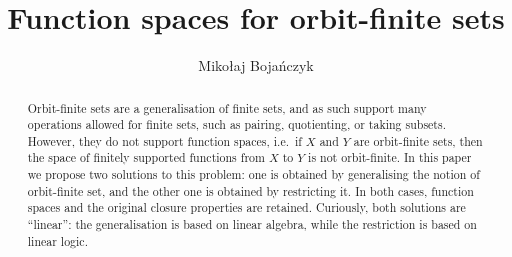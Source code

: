 \documentclass[a4paper,UKenglish,cleveref, autoref, numberwithinsect, thm-restate,anonymous]{lipics-v2021}
\title{Function spaces for orbit-finite sets} %
\author{Miko{\l}aj Boja\'nczyk}{University of Warsaw}{bojan@mimuw.edu.pl}{https://orcid.org/0000-0002-1825-0097}{(Optional) author-specific funding acknowledgements}
\begin{document}
\newcommand{\loli}{\multimap}


\maketitle 
\begin{abstract}
    Orbit-finite sets are a generalisation of finite sets, and as such support many operations allowed for finite sets, such as pairing, quotienting, or taking subsets. However, they do not support function spaces, i.e.~if $X$ and $Y$ are orbit-finite sets, then the space of finitely supported functions from $X$ to $Y$ is not orbit-finite. In this paper we propose two solutions to this problem: one is obtained by generalising the notion of orbit-finite set, and the other one is obtained by restricting it. In both cases, function spaces and the original closure properties are retained. Curiously, both solutions are ``linear'': the generalisation is based on linear algebra, while the restriction is based on linear logic.
\end{abstract}





% 






\appendix


\end{document}
